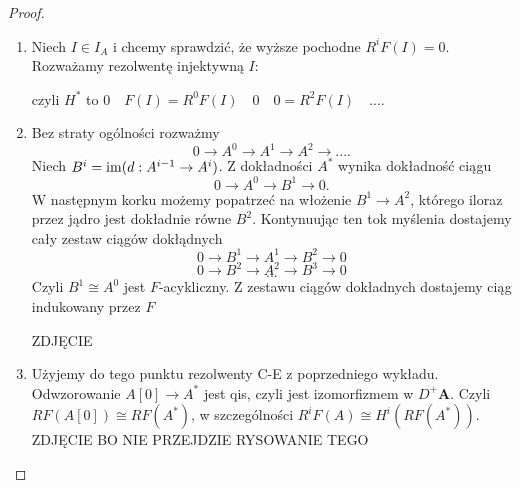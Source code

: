 \begin{proof}
  \begin{enumerate}
    \item Niech $I\in I_A$ i chcemy sprawdzić, że wyższe pochodne $R^iF(I)=0$. Rozważamy rezolwentę injektywną $I$:
      \begin{center}\end{center}
      czyli $H^*$ to $0\quad F(I)=R^0F(I) \quad 0\quad 0=R^2F(I)\quad ...$.
    \item  Bez straty ogólności rozważmy
      $$0\to A^0\to A^1\to A^2\to....$$
      Niech $B^i=\operatorname{im}(d:A^{i-1}\to A^i)$. Z dokładności $A^*$ wynika dokładność ciągu
      $$0\to A^0\to B^1\to 0.$$
      W następnym korku możemy popatrzeć na włożenie $B^1\to A^2$, którego iloraz przez jądro jest dokładnie równe $B^2$. Kontynuując ten tok myślenia dostajemy cały zestaw ciągów dokłądnych
      $$0\to B^1\to A^1\to B^2\to 0$$
      $$0\to B^2\to A^2\to B^3\to 0$$
      $$...$$
      Czyli $B^1\cong A^0$ jest $F$-acykliczny. Z zestawu ciągów dokładnych dostajemy ciąg indukowany przez $F$
      \begin{center}\end{center}

      \begin{center}\end{center}
      {\color{red}ZDJĘCIE}
    \item Użyjemy do tego punktu rezolwenty C-E z poprzedniego wykładu.
      Odwzorowanie $A[0]\to A^*$ jest qis, czyli jest izomorfizmem w $D^+\mathbf{A}$. Czyli $RF(A[0])\cong RF(A^*)$, w szczególności $R^iF(A)\cong H^i(RF(A^*))$.
      {\large\color{red}ZDJĘCIE BO NIE PRZEJDZIE RYSOWANIE TEGO}
  \end{enumerate}
\end{proof}

